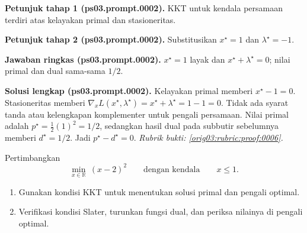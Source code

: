 \par\noindent\textbf{Petunjuk tahap 1 (ps03.prompt.0002).}
KKT untuk kendala persamaan terdiri atas kelayakan primal dan stasioneritas.
\label{orig03:ps03:hint1:0002}
\par\noindent\textbf{Petunjuk tahap 2 (ps03.prompt.0002).}
Substitusikan $x^\star=1$ dan $\lambda^\star=-1$.
\label{orig03:ps03:hint2:0002}
\par\noindent\textbf{Jawaban ringkas (ps03.prompt.0002).}
$x^\star=1$ layak dan
$x^\star+\lambda^\star=0$; nilai primal dan dual sama-sama $1/2$.
\label{orig03:ps03:answer:0002}
\par\noindent\textbf{Solusi lengkap (ps03.prompt.0002).}
Kelayakan primal memberi $x^\star-1=0$. Stasioneritas memberi
$\nabla_xL(x^\star,\lambda^\star)=x^\star+\lambda^\star=1-1=0$.
Tidak ada syarat tanda atau kelengkapan komplementer untuk pengali persamaan.
Nilai primal adalah $p^\star=\tfrac12(1)^2=1/2$, sedangkan hasil dual pada
subbutir sebelumnya memberi $d^\star=1/2$. Jadi
$p^\star-d^\star=0$.
\emph{Rubrik bukti: \ref{orig03:rubric:proof:0006}.}
\label{orig03:ps03:solution:0002}

\begin{exercise}
\label{orig03:ps03:problem:0002}
Pertimbangkan
\[
 \min_{x\in\mathbb{R}}\ (x-2)^2
 \qquad\text{dengan kendala}\qquad x\leq1.
\]
\begin{enumerate}
\item\label{orig03:ps03:prompt:0003}
Gunakan kondisi KKT untuk menentukan solusi primal dan pengali optimal.
\item\label{orig03:ps03:prompt:0004}
Verifikasi kondisi Slater, turunkan fungsi dual, dan periksa nilainya di
pengali optimal.
\end{enumerate}
\end{exercise}

